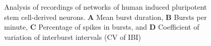\documentclass[12pt, titlepage]{article}
\begin{document}
		\begin{figure}[h]
			\centering
			\caption{Analysis of recordings of networks of human induced pluripotent stem cell-derived neurons. \textbf{A} Mean burst duration, \textbf{B} Bursts per minute, \textbf{C} Percentage of spikes in bursts, and \textbf{D} Coefficient of variation of interburst intervals (CV of IBI)}
			\label{hiPSN_results}
		\end{figure}
\end{document}
